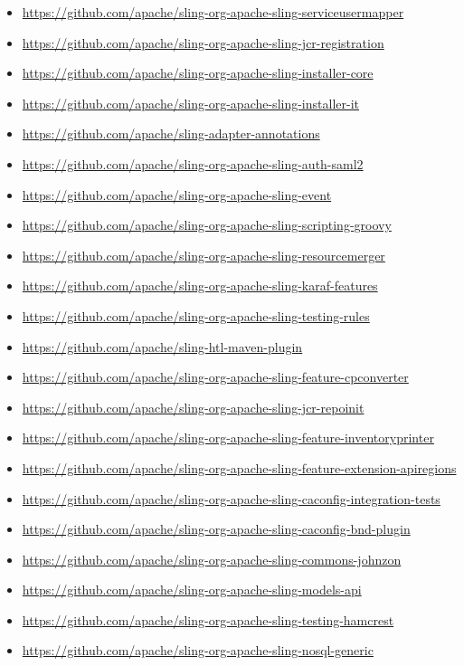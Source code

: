 \documentclass[sigconf]{acmart}
\begin{document}
\begin{itemize}
  \item \url{https://github.com/apache/sling-org-apache-sling-serviceusermapper}
  \item \url{https://github.com/apache/sling-org-apache-sling-jcr-registration}
  \item \url{https://github.com/apache/sling-org-apache-sling-installer-core}
  \item \url{https://github.com/apache/sling-org-apache-sling-installer-it}
  \item \url{https://github.com/apache/sling-adapter-annotations}
  \item \url{https://github.com/apache/sling-org-apache-sling-auth-saml2}
  \item \url{https://github.com/apache/sling-org-apache-sling-event}
  \item \url{https://github.com/apache/sling-org-apache-sling-scripting-groovy}
  \item \url{https://github.com/apache/sling-org-apache-sling-resourcemerger}
  \item \url{https://github.com/apache/sling-org-apache-sling-karaf-features}
  \item \url{https://github.com/apache/sling-org-apache-sling-testing-rules}
  \item \url{https://github.com/apache/sling-htl-maven-plugin}
  \item \url{https://github.com/apache/sling-org-apache-sling-feature-cpconverter}
  \item \url{https://github.com/apache/sling-org-apache-sling-jcr-repoinit}
  \item \url{https://github.com/apache/sling-org-apache-sling-feature-inventoryprinter}
  \item \url{https://github.com/apache/sling-org-apache-sling-feature-extension-apiregions}
  \item \url{https://github.com/apache/sling-org-apache-sling-caconfig-integration-tests}
  \item \url{https://github.com/apache/sling-org-apache-sling-caconfig-bnd-plugin}
  \item \url{https://github.com/apache/sling-org-apache-sling-commons-johnzon}
  \item \url{https://github.com/apache/sling-org-apache-sling-models-api}
  \item \url{https://github.com/apache/sling-org-apache-sling-testing-hamcrest}
  \item \url{https://github.com/apache/sling-org-apache-sling-nosql-generic}

\end{itemize}
\end{document}
